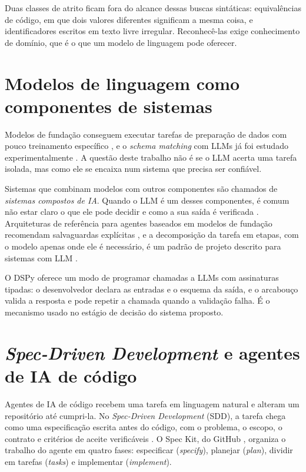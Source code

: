 Duas classes de atrito ficam fora do alcance dessas buscas sintáticas:
equivalências de código, em que dois valores diferentes significam a mesma
coisa, e identificadores escritos em texto livre irregular. Reconhecê-las
exige conhecimento de domínio, que é o que um modelo de linguagem pode
oferecer.

\section{Modelos de linguagem como componentes de sistemas}
\label{sec:fundamentacao-modelos-de-linguagem}

Modelos de fundação conseguem executar tarefas de preparação de dados com
pouco treinamento específico \cite{narayan2022wrangle}, e o \emph{schema
matching} com LLMs já foi estudado experimentalmente
\cite{parciak2024schema}. A questão deste trabalho não é se o LLM acerta uma
tarefa isolada, mas como ele se encaixa num sistema que precisa ser
confiável.

Sistemas que combinam modelos com outros componentes são chamados de
\emph{sistemas compostos de IA}. Quando o LLM é um desses componentes, é
comum não estar claro o que ele pode decidir e como a sua saída é verificada
\cite{shao2025integration}. Arquiteturas de referência para agentes baseados
em modelos de fundação recomendam salvaguardas explícitas
\cite{lu2024refarch}, e a decomposição da tarefa em etapas, com o modelo
apenas onde ele é necessário, é um padrão de projeto descrito para sistemas
com LLM \cite{marquez2025patterns}.

O DSPy \cite{khattab2024dspy} oferece um modo de programar chamadas a LLMs
com assinaturas tipadas: o desenvolvedor declara as entradas e o esquema da
saída, e o arcabouço valida a resposta e pode repetir a chamada quando a
validação falha. É o mecanismo usado no estágio de decisão do sistema
proposto.

\section{\emph{Spec-Driven Development} e agentes de IA de código}
\label{sec:fundamentacao-spec-driven-development-e-agentes-de-ia-de-codigo}

Agentes de IA de código recebem uma tarefa em linguagem natural e alteram um
repositório até cumpri-la. No \emph{Spec-Driven Development} (SDD), a tarefa
chega como uma especificação escrita antes do código, com o problema, o
escopo, o contrato e critérios de aceite verificáveis
\cite{bockeler2025sdd}. O Spec Kit, do GitHub \cite{speckit}, organiza o
trabalho do agente em quatro fases: especificar (\emph{specify}), planejar
(\emph{plan}), dividir em tarefas (\emph{tasks}) e implementar
(\emph{implement}).

